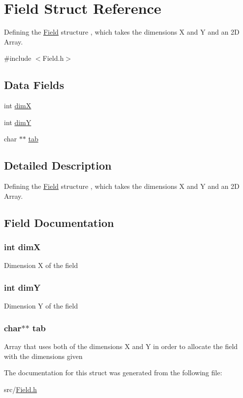 \hypertarget{struct_field}{\section{Field Struct Reference}
\label{struct_field}
}


Defining the \hyperlink{struct_field}{Field} structure , which takes the dimensions X and Y and an 2\-D Array.  




{\ttfamily \#include $<$Field.\-h$>$}

\subsection*{Data Fields}
\begin{DoxyCompactItemize}
\item 
int \hyperlink{struct_field_a199e2332426468f291193be4f0cc8519}{dim\-X}
\item 
int \hyperlink{struct_field_ac9e5aa156e9d0b8ccd6110d3257e50c7}{dim\-Y}
\item 
char $\ast$$\ast$ \hyperlink{struct_field_a095ef5f32e2dd3c36f801fc514372ee3}{tab}
\end{DoxyCompactItemize}


\subsection{Detailed Description}
Defining the \hyperlink{struct_field}{Field} structure , which takes the dimensions X and Y and an 2\-D Array. 

\subsection{Field Documentation}
\hypertarget{struct_field_a199e2332426468f291193be4f0cc8519}{
\subsubsection[{dim\-X}]{\setlength{\rightskip}{0pt plus 5cm}int dim\-X}}\label{struct_field_a199e2332426468f291193be4f0cc8519}
Dimension X of the field \hypertarget{struct_field_ac9e5aa156e9d0b8ccd6110d3257e50c7}{
\subsubsection[{dim\-Y}]{\setlength{\rightskip}{0pt plus 5cm}int dim\-Y}}\label{struct_field_ac9e5aa156e9d0b8ccd6110d3257e50c7}
Dimension Y of the field \hypertarget{struct_field_a095ef5f32e2dd3c36f801fc514372ee3}{
\subsubsection[{tab}]{\setlength{\rightskip}{0pt plus 5cm}char$\ast$$\ast$ tab}}\label{struct_field_a095ef5f32e2dd3c36f801fc514372ee3}
Array that uses both of the dimensions X and Y in order to allocate the field with the dimensions given 

The documentation for this struct was generated from the following file\-:\begin{DoxyCompactItemize}
\item 
src/\hyperlink{_field_8h}{Field.\-h}\end{DoxyCompactItemize}
